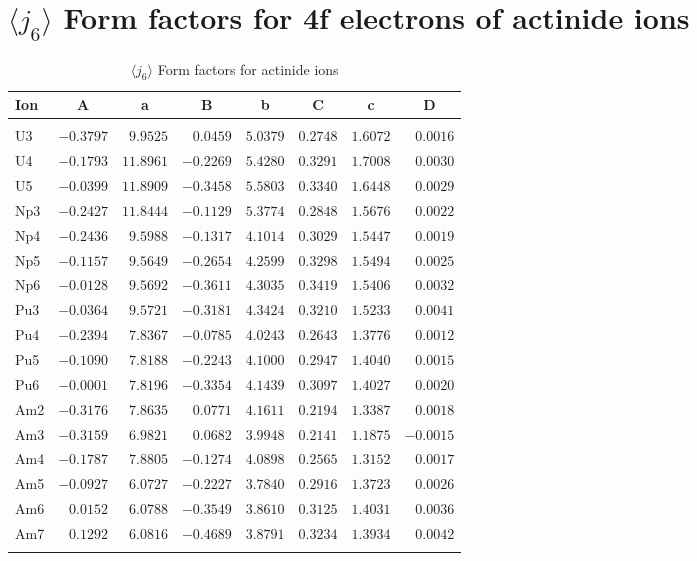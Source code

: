 \section{{\large$\langle j_6\rangle$} Form factors for 4f electrons of actinide ions}
\begin{table}[H]
\caption{$\langle j_6\rangle$ Form factors for actinide ions}\vspace{2mm}
\label{acj6}
{\tablesize
\begin{tabular}{lrrrrrrr}
\hline
Ion&
\multicolumn{1}{c}{A}&\multicolumn{1}{c}{a}&
\multicolumn{1}{c}{B}&\multicolumn{1}{c}{b}&
\multicolumn{1}{c}{C}&\multicolumn{1}{c}{c}&\multicolumn{1}{c}{D}\\
\hline\\[-2ex]
U3 &$-0.3797$ &$9.9525$ &$0.0459$ &$5.0379$ &$0.2748$ &$1.6072$ &$0.0016$ \\
U4 &$-0.1793$ &$11.8961$ &$-0.2269$ &$5.4280$ &$0.3291$ &$1.7008$ &$0.0030$ \\
U5 &$-0.0399$ &$11.8909$ &$-0.3458$ &$5.5803$ &$0.3340$ &$1.6448$ &$0.0029$ \\
Np3 &$-0.2427$ &$11.8444$ &$-0.1129$ &$5.3774$ &$0.2848$ &$1.5676$ &$0.0022$ \\
Np4 &$-0.2436$ &$9.5988$ &$-0.1317$ &$4.1014$ &$0.3029$ &$1.5447$ &$0.0019$ \\
Np5 &$-0.1157$ &$9.5649$ &$-0.2654$ &$4.2599$ &$0.3298$ &$1.5494$ &$0.0025$ \\
Np6 &$-0.0128$ &$9.5692$ &$-0.3611$ &$4.3035$ &$0.3419$ &$1.5406$ &$0.0032$ \\
Pu3 &$-0.0364$ &$9.5721$ &$-0.3181$ &$4.3424$ &$0.3210$ &$1.5233$ &$0.0041$ \\
Pu4 &$-0.2394$ &$7.8367$ &$-0.0785$ &$4.0243$ &$0.2643$ &$1.3776$ &$0.0012$ \\
Pu5 &$-0.1090$ &$7.8188$ &$-0.2243$ &$4.1000$ &$0.2947$ &$1.4040$ &$0.0015$ \\
Pu6 &$-0.0001$ &$7.8196$ &$-0.3354$ &$4.1439$ &$0.3097$ &$1.4027$ &$0.0020$ \\
Am2 &$-0.3176$ &$7.8635$ &$0.0771$ &$4.1611$ &$0.2194$ &$1.3387$ &$0.0018$ \\
Am3 &$-0.3159$ &$6.9821$ &$0.0682$ &$3.9948$ &$0.2141$ &$1.1875$ &$-0.0015$ \\
Am4 &$-0.1787$ &$7.8805$ &$-0.1274$ &$4.0898$ &$0.2565$ &$1.3152$ &$0.0017$ \\
Am5 &$-0.0927$ &$6.0727$ &$-0.2227$ &$3.7840$ &$0.2916$ &$1.3723$ &$0.0026$ \\
Am6 &$0.0152$ &$6.0788$ &$-0.3549$ &$3.8610$ &$0.3125$ &$1.4031$ &$0.0036$ \\
Am7 &$0.1292$ &$6.0816$ &$-0.4689$ &$3.8791$ &$0.3234$ &$1.3934$ &$0.0042$ \\
\hline\\[-2ex]
\end{tabular}
}
\end{table}

